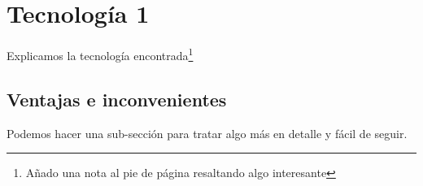 
\section{Tecnología 1}

Explicamos la tecnología encontrada\footnote{Añado una nota al pie de página resaltando algo interesante}

\subsection{Ventajas e inconvenientes}

Podemos hacer una sub-sección para tratar algo más en detalle y fácil de seguir.
